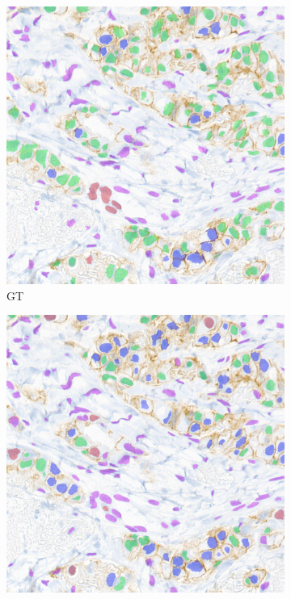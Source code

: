 \begin{figure}[H]
  \centering
  \begin{subfigure}[b]{0.45\textwidth}
    \includegraphics[width=\textwidth]{imgs/qual/breast/gt3.overlay.png}
    \caption{GT}
    \label{fig:breast-gt3}
  \end{subfigure}
  \hfill
  \begin{subfigure}[b]{0.45\textwidth}
    \includegraphics[width=\textwidth]{imgs/qual/breast/hov3.png}

\end{subfigure}
\end{figure}
